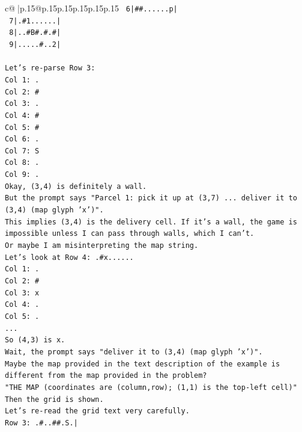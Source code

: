 \documentclass{article}
\begin{document}
{\begin{supertabular}{c@{$\;$}|p{.15\linewidth}@{}p{.15\linewidth}p{.15\linewidth}p{.15\linewidth}p{.15\linewidth}p{.15\linewidth}}
{{{\texttt{ 6|\#\#......p|} \\
\texttt{ 7|.\#1......|} \\
\texttt{ 8|..\#B\#.\#.\#|} \\
\texttt{ 9|.....\#..2|} \\
\\ 
\texttt{Let's re{-}parse Row 3:} \\
\texttt{Col 1: .} \\
\texttt{Col 2: \#} \\
\texttt{Col 3: .} \\
\texttt{Col 4: \#} \\
\texttt{Col 5: \#} \\
\texttt{Col 6: .} \\
\texttt{Col 7: S} \\
\texttt{Col 8: .} \\
\texttt{Col 9: .} \\
\texttt{Okay, (3,4) is definitely a wall.} \\
\texttt{But the prompt says "Parcel 1: pick it up at (3,7) ... deliver it to (3,4) (map glyph 'x')".} \\
\texttt{This implies (3,4) is the delivery cell. If it's a wall, the game is impossible unless I can pass through walls, which I can't.} \\
\texttt{Or maybe I am misinterpreting the map string.} \\
\texttt{Let's look at Row 4: .\#x......} \\
\texttt{Col 1: .} \\
\texttt{Col 2: \#} \\
\texttt{Col 3: x} \\
\texttt{Col 4: .} \\
\texttt{Col 5: .} \\
\texttt{...} \\
\texttt{So (4,3) is x.} \\
\texttt{Wait, the prompt says "deliver it to (3,4) (map glyph 'x')".} \\
\texttt{Maybe the map provided in the text description of the example is different from the map provided in the problem?} \\
\texttt{"THE MAP (coordinates are (column,row); (1,1) is the top{-}left cell)"} \\
\texttt{Then the grid is shown.} \\
\texttt{Let's re{-}read the grid text very carefully.} \\
\texttt{Row 3: .\#..\#\#.S.|} \\
}}}
\end{supertabular}}
\end{document}
